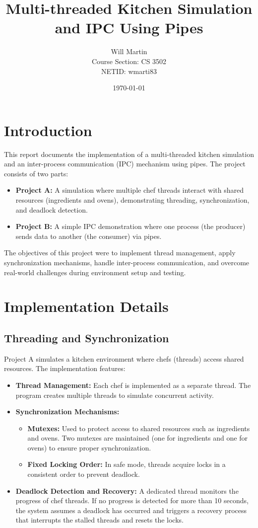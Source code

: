 \documentclass[12pt]{article}
\title{Multi-threaded Kitchen Simulation and IPC Using Pipes}
\author{Will Martin\\ Course Section: CS 3502\\ NETID: wmarti83}
\date{\today}
\begin{document}
\maketitle

\tableofcontents
\newpage

\section{Introduction}
This report documents the implementation of a multi-threaded kitchen simulation and an inter-process communication (IPC) mechanism using pipes. The project consists of two parts:
\begin{itemize}
    \item \textbf{Project A:} A simulation where multiple chef threads interact with shared resources (ingredients and ovens), demonstrating threading, synchronization, and deadlock detection.
    \item \textbf{Project B:} A simple IPC demonstration where one process (the producer) sends data to another (the consumer) via pipes.
\end{itemize}
The objectives of this project were to implement thread management, apply synchronization mechanisms, handle inter-process communication, and overcome real-world challenges during environment setup and testing.

\section{Implementation Details}
\subsection{Threading and Synchronization}
Project A simulates a kitchen environment where chefs (threads) access shared resources. The implementation features:
\begin{itemize}
    \item \textbf{Thread Management:} Each chef is implemented as a separate thread. The program creates multiple threads to simulate concurrent activity.
    \item \textbf{Synchronization Mechanisms:} 
    \begin{itemize}
        \item \textbf{Mutexes:} Used to protect access to shared resources such as ingredients and ovens. Two mutexes are maintained (one for ingredients and one for ovens) to ensure proper synchronization.
        \item \textbf{Fixed Locking Order:} In safe mode, threads acquire locks in a consistent order to prevent deadlock.
    \end{itemize}
    \item \textbf{Deadlock Detection and Recovery:} A dedicated thread monitors the progress of chef threads. If no progress is detected for more than 10 seconds, the system assumes a deadlock has occurred and triggers a recovery process that interrupts the stalled threads and resets the locks.
\end{itemize}
\end{document}
